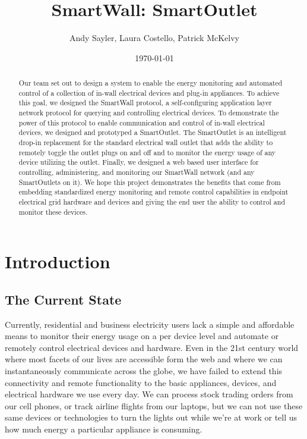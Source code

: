 \documentclass[12pt]{article}
\title{SmartWall: SmartOutlet}
\author{Andy Sayler, Laura Costello, Patrick McKelvy}
\date{\today}
\begin{document}
\maketitle
    
\begin{abstract}

Our team set out to design a system to enable the energy monitoring and
automated control of a collection of in-wall electrical devices and plug-in
appliances. To achieve this goal, we designed the SmartWall protocol,
a self-configuring application layer network protocol for querying and
controlling electrical devices. To demonstrate the power of this protocol
to enable communication and control of in-wall electrical devices, we
designed and prototyped a SmartOutlet. The SmartOutlet is an
intelligent drop-in
replacement for the standard electrical wall outlet that adds the
ability to remotely toggle the outlet plugs on and off and to monitor the
energy usage of any device utilizing the outlet. Finally, we designed a
web based user interface for controlling, administering, and
monitoring our SmartWall network (and any SmartOutlets on it). We hope
this project demonstrates the benefits that come from embedding
standardized energy monitoring and remote control capabilities in
endpoint electrical grid hardware and devices and giving the end user
the ability to control and monitor these devices.
  
\end{abstract}

\pagebreak

\tableofcontents

\pagebreak

\section{Introduction}

\subsection{The Current State}
Currently, residential and business electricity users lack a simple
and affordable means to monitor their energy usage on a per device
level and automate or remotely control electrical devices and
hardware. Even in the 21st century world where most facets of our
lives are accessible form the web and where we can instantaneously
communicate across the globe, we have failed to extend this
connectivity and remote functionality to the basic appliances, devices,
and electrical hardware we use every day. We can process stock trading
orders from our cell phones, or track airline flights from our
laptops, but we can not use these same devices or technologies to turn
the lights out while we're at work or tell us how much energy a
particular appliance is consuming.
\end{document}
